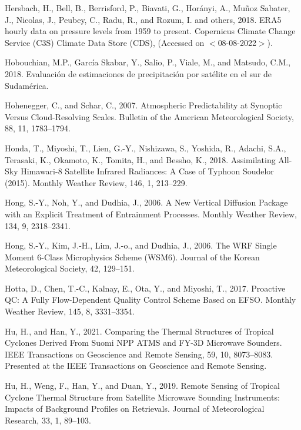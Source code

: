\documentclass[12pt,oneside,a4paper]{reedthesis}
\begin{document}
\leavevmode\hypertarget{ref-era5pressure}{}%
Hersbach, H., Bell, B., Berrisford, P., Biavati, G., Horányi, A., Muñoz Sabater, J., Nicolas, J., Peubey, C., Radu, R., and Rozum, I. and others, 2018. ERA5 hourly data on pressure levels from 1959 to present. Copernicus Climate Change Service (C3S) Climate Data Store (CDS), (Accessed on \(<\)08-08-2022\(>\)).

\leavevmode\hypertarget{ref-hobouchian2018}{}%
Hobouchian, M.P., García Skabar, Y., Salio, P., Viale, M., and Matsudo, C.M., 2018. Evaluación de estimaciones de precipitación por satélite en el sur de Sudamérica.

\leavevmode\hypertarget{ref-hohenegger2007}{}%
Hohenegger, C., and Schar, C., 2007. Atmospheric Predictability at Synoptic Versus Cloud-Resolving Scales. Bulletin of the American Meteorological Society, 88, 11, 1783--1794.

\leavevmode\hypertarget{ref-honda2018}{}%
Honda, T., Miyoshi, T., Lien, G.-Y., Nishizawa, S., Yoshida, R., Adachi, S.A., Terasaki, K., Okamoto, K., Tomita, H., and Bessho, K., 2018. Assimilating All-Sky Himawari-8 Satellite Infrared Radiances: A Case of Typhoon Soudelor (2015). Monthly Weather Review, 146, 1, 213--229.

\leavevmode\hypertarget{ref-hong2006}{}%
Hong, S.-Y., Noh, Y., and Dudhia, J., 2006. A New Vertical Diffusion Package with an Explicit Treatment of Entrainment Processes. Monthly Weather Review, 134, 9, 2318--2341.

\leavevmode\hypertarget{ref-hong2006a}{}%
Hong, S.-Y., Kim, J.-H., Lim, J.-o., and Dudhia, J., 2006. The WRF Single Moment 6-Class Microphysics Scheme (WSM6). Journal of the Korean Meteorological Society, 42, 129--151.

\leavevmode\hypertarget{ref-hotta2017}{}%
Hotta, D., Chen, T.-C., Kalnay, E., Ota, Y., and Miyoshi, T., 2017. Proactive QC: A Fully Flow-Dependent Quality Control Scheme Based on EFSO. Monthly Weather Review, 145, 8, 3331--3354.

\leavevmode\hypertarget{ref-hu2021}{}%
Hu, H., and Han, Y., 2021. Comparing the Thermal Structures of Tropical Cyclones Derived From Suomi NPP ATMS and FY-3D Microwave Sounders. IEEE Transactions on Geoscience and Remote Sensing, 59, 10, 8073--8083. Presented at the IEEE Transactions on Geoscience and Remote Sensing.

\leavevmode\hypertarget{ref-hu2019}{}%
Hu, H., Weng, F., Han, Y., and Duan, Y., 2019. Remote Sensing of Tropical Cyclone Thermal Structure from Satellite Microwave Sounding Instruments: Impacts of Background Profiles on Retrievals. Journal of Meteorological Research, 33, 1, 89--103.
\end{document}

